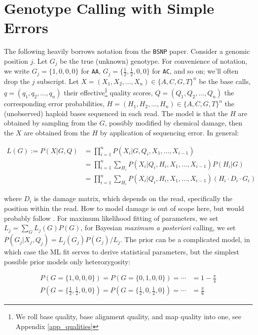 \documentclass{article}
\begin{document}
\section{Genotype Calling with Simple Errors}

The following heavily borrows notation from the \texttt{BSNP}\cite{bsnp} paper.  Consider a
genomic position $j$.  Let $G_j$ be the true (unknown) genotype.  For
convenience of notation, we write $G_j=\{1,0,0,0\}$ for \texttt{AA},
$G_j=\{\frac{1}{2},\frac{1}{2},0,0\}$ for \texttt{AC}, and so on; we'll
often drop the $j$ subscript.  Let $X=(X_1, X_2, \ldots, X_n) \in
\{A,C,G,T\}^n$ be the base calls, $q=(q_1, q_2, \ldots, q_n)$ their
effective\footnote{We roll base quality, base alignment quality, and map
quality into one, see Appendix \ref{app_qualities}} quality scores, $Q=(Q_1, Q_2,
\ldots, Q_n)$ the corresponding error probabilities, $H=(H_1, H_2,
\ldots, H_n) \in \{A,C,G,T\}^n$ the (unobserved) haploid bases
sequenced in each read.  The model is that the $H$ are obtained by
sampling from the $G$, possibly modified by chemical damage, then the
$X$ are obtained from the $H$ by application of sequencing error.  In
general:

\begin{align*}
L(G) := P(X|G,Q) &= \prod_{i=1}^n P(X_i|G,Q_i,X_1,\ldots,X_{i-1}) \\
     &= \prod_{i=1}^n \sum_{H_i} P(X_i|Q_i,H_i,X_1,\ldots,X_{i-1}) P(H_i|G) \\
     &= \prod_{i=1}^n \sum_{H_i} P(X_i|Q_i,H_i,X_1,\ldots,X_{i-1}) (H_i \cdot D_i \cdot G_i)
\end{align*}

where $D_i$ is the damage matrix, which depends on the read,
specifically the position within the read.  How to model damage is out
of scope here, but would probably follow \cite{mapdamage}.
For maximum likelihood fitting of parameters, we set $L_j = \sum_G L_j(G) P(G)$, for Bayesian \emph{maximum a posteriori} calling,
we set $P(G_j|X_j,Q_j) = L_j(G_j) P(G_j) / L_j$.  The prior can be a complicated model, in which case the ML fit serves to
derive statistical parameters, but the simplest possible prior models only heterozygosity:

\begin{align*}
P(G=\{1,0,0,0\}) = P(G=\{0,1,0,0\}) = \cdots &= 1 - \frac{\pi}{4} \\
P(G=\{\frac{1}{2},\frac{1}{2},0,0\}) = P(G=\{\frac{1}{2},0,\frac{1}{2},0\}) = \cdots &= \frac{\pi}{6}
\end{align*}
\end{document}
